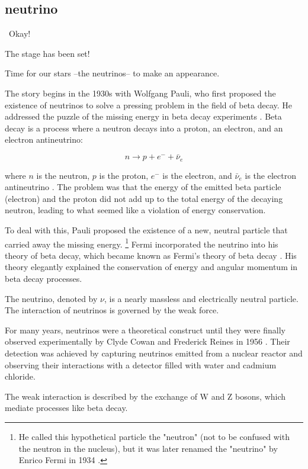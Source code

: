 \subsection{neutrino}\
Okay!

The stage has been set!

Time for our stars --the neutrinos-- to make an appearance.

The story begins in the 1930s with Wolfgang Pauli, who first proposed the existence of neutrinos to solve a pressing problem in the field of beta decay.
He addressed the puzzle of the missing energy in beta decay experiments \cite{Pauli_letter}.
Beta decay is a process where a neutron decays into a proton, an electron, and an electron antineutrino:

\[
  n \rightarrow p + e^- + \bar{\nu}_e
\]

where \( n \) is the neutron, \( p \) is the proton, \( e^- \) is the electron, and \( \bar{\nu}_e \) is the electron antineutrino \cite{Basdevant_Rich_Spiro_2005}.
The problem was that the energy of the emitted beta particle (electron) and the proton did not add up to the total energy of the decaying neutron, leading to what seemed like a violation of energy conservation.

To deal with this, Pauli proposed the existence of a new, neutral particle that carried away the missing energy.
\footnote{He called this hypothetical particle the "neutron" (not to be confused with the neutron in the nucleus), but it was later renamed the "neutrino" by Enrico Fermi in 1934 \cite{Fermi_decay}.}
Fermi incorporated the neutrino into his theory of beta decay, which became known as Fermi's theory of beta decay \cite{Fermi_decay}.
His theory elegantly explained the conservation of energy and angular momentum in beta decay processes.

The neutrino, denoted by \( \nu \), is a nearly massless and electrically neutral particle.
The interaction of neutrinos is governed by the weak force.

For many years, neutrinos were a theoretical construct until they were finally observed experimentally by Clyde Cowan and Frederick Reines in 1956 \cite{Shea_1983}.
Their detection was achieved by capturing neutrinos emitted from a nuclear reactor and observing their interactions with a detector filled with water and cadmium chloride.

The weak interaction is described by the exchange of W and Z bosons, which mediate processes like beta decay.

